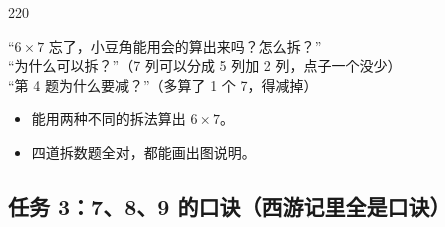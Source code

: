 \begin{lesson}{2}{20}
\begin{saybox}
“$6\times7$ 忘了，小豆角能用会的算出来吗？怎么拆？”\\
“为什么可以拆？”（7 列可以分成 5 列加 2 列，点子一个没少）\\
“第 4 题为什么要减？”（多算了 1 个 7，得减掉）
\end{saybox}

\begin{passbox}
\begin{itemize}
  \item 能用两种不同的拆法算出 $6\times7$。
  \item 四道拆数题全对，都能画出图说明。
\end{itemize}
\end{passbox}
\end{lesson}

\subsection{任务 3：7、8、9 的口诀（西游记里全是口诀）}

